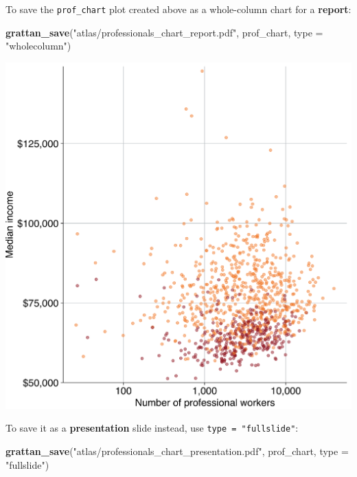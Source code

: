 \documentclass[]{book}
\newenvironment{Shaded}{\begin{snugshade}}{\end{snugshade}}
\newcommand{\DataTypeTok}[1]{\textcolor[rgb]{0.13,0.29,0.53}{#1}}
\newcommand{\KeywordTok}[1]{\textcolor[rgb]{0.13,0.29,0.53}{\textbf{#1}}}
\newcommand{\NormalTok}[1]{#1}
\newcommand{\StringTok}[1]{\textcolor[rgb]{0.31,0.60,0.02}{#1}}
\begin{document}
To save the \texttt{prof\_chart} plot created above as a whole-column chart for a \textbf{report}:

\begin{Shaded}
\begin{Highlighting}[]
\KeywordTok{grattan_save}\NormalTok{(}\StringTok{"atlas/professionals_chart_report.pdf"}\NormalTok{, prof_chart, }\DataTypeTok{type =} \StringTok{"wholecolumn"}\NormalTok{)}
\end{Highlighting}
\end{Shaded}

\includegraphics[width=38.76in]{atlas/professionals_chart_report}

To save it as a \textbf{presentation} slide instead, use \texttt{type\ =\ "fullslide"}:

\begin{Shaded}
\begin{Highlighting}[]
\KeywordTok{grattan_save}\NormalTok{(}\StringTok{"atlas/professionals_chart_presentation.pdf"}\NormalTok{, prof_chart, }\DataTypeTok{type =} \StringTok{"fullslide"}\NormalTok{)}
\end{Highlighting}
\end{Shaded}
\end{document}
